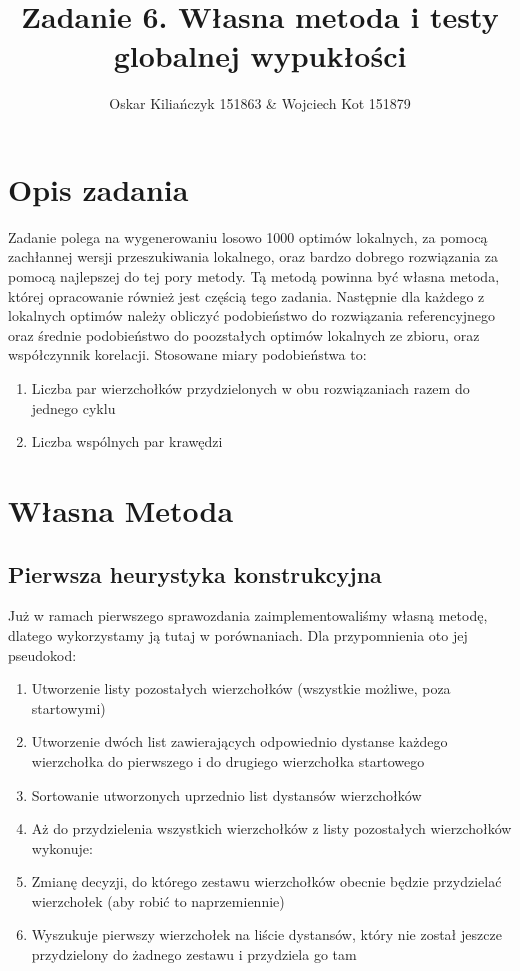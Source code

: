 \documentclass[11pt]{article}
\title{Zadanie 6. Własna metoda i testy globalnej wypukłości}
\author{Oskar Kiliańczyk 151863 \& Wojciech Kot 151879}
\date{}
\begin{document}
\maketitle
\newpage

\section{Opis zadania}\label{sec:opis-zadania}
Zadanie polega na wygenerowaniu losowo 1000 optimów lokalnych, za pomocą zachłannej wersji przeszukiwania lokalnego,
oraz bardzo dobrego rozwiązania za pomocą najlepszej do tej pory metody.
Tą metodą powinna być własna metoda, której opracowanie również jest częścią tego zadania.
Następnie dla każdego z lokalnych optimów należy obliczyć podobieństwo do rozwiązania referencyjnego oraz średnie podobieństwo do poozstałych optimów lokalnych ze zbioru, oraz współczynnik korelacji.
Stosowane miary podobieństwa to:
\begin{enumerate}
    \item Liczba par wierzchołków przydzielonych w obu rozwiązaniach razem do jednego cyklu
    \item Liczba wspólnych par krawędzi
\end{enumerate}


\section{Własna Metoda}\label{sec:wasna-metoda}

\subsection{Pierwsza heurystyka konstrukcyjna}\label{subsec:pierwsza-heurystyka-konstukcyjna}

Już w ramach pierwszego sprawozdania zaimplementowaliśmy własną metodę, dlatego wykorzystamy ją tutaj w porównaniach.
Dla przypomnienia oto jej pseudokod:

\begin{enumerate}
    \item Utworzenie listy pozostałych wierzchołków (wszystkie możliwe, poza startowymi)
    \item Utworzenie dwóch list zawierających odpowiednio dystanse każdego wierzchołka do pierwszego i do drugiego wierzchołka startowego
    \item Sortowanie utworzonych uprzednio list dystansów wierzchołków
    \item Aż do przydzielenia wszystkich wierzchołków z listy pozostałych wierzchołków wykonuje:
    \item Zmianę decyzji, do którego zestawu wierzchołków obecnie będzie przydzielać wierzchołek (aby robić to naprzemiennie)
    \item Wyszukuje pierwszy wierzchołek na liście dystansów, który nie został jeszcze przydzielony do żadnego zestawu i przydziela go tam
\end{enumerate}
\end{document}
